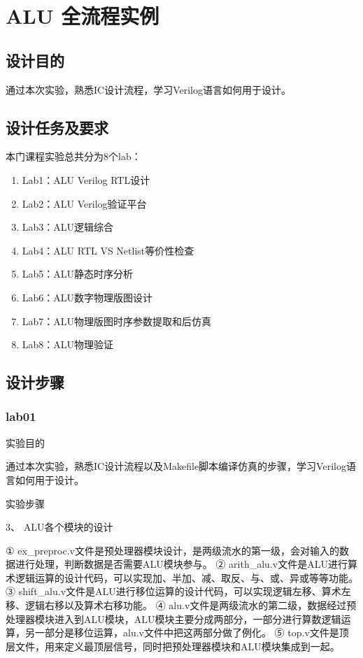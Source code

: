 \chapter{ALU 全流程实例}

\section{设计目的}

通过本次实验，熟悉IC设计流程，学习Verilog语言如何用于设计。

\section{设计任务及要求}

本门课程实验总共分为8个lab：

\begin{enumerate}
  \item Lab1：ALU Verilog RTL设计
  \item Lab2：ALU Verilog验证平台
  \item Lab3：ALU逻辑综合
  \item Lab4：ALU RTL VS Netlist等价性检查
  \item Lab5：ALU静态时序分析
  \item Lab6：ALU数字物理版图设计
  \item Lab7：ALU物理版图时序参数提取和后仿真
  \item Lab8：ALU物理验证
\end{enumerate}

\section{设计步骤}

\subsection{lab01}

实验目的

通过本次实验，熟悉IC设计流程以及Makefile脚本编译仿真的步骤，学习Verilog语言如何用于设计。

实验步骤

3、	ALU各个模块的设计

① ex\_preproc.v文件是预处理器模块设计，是两级流水的第一级，会对输入的数据进行处理，判断数据是否需要ALU模块参与。
② arith\_alu.v文件是ALU进行算术逻辑运算的设计代码，可以实现加、半加、减、取反、与、或、异或等等功能。
③ shift\_alu.v文件是ALU进行移位运算的设计代码，可以实现逻辑左移、算术左移、逻辑右移以及算术右移功能。
④ alu.v文件是两级流水的第二级，数据经过预处理器模块进入到ALU模块，ALU模块主要分成两部分，一部分进行算数逻辑运算，另一部分是移位运算，alu.v文件中把这两部分做了例化。
⑤ top.v文件是顶层文件，用来定义最顶层信号，同时把预处理器模块和ALU模块集成到一起。

